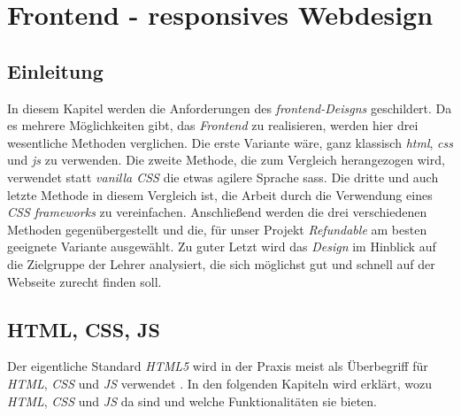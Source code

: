 
\section{Frontend - responsives Webdesign}
\label{chapter:study-frontend}
	\subsection{Einleitung}
	\label{chapter:study-frontend-einleitung}
	In diesem Kapitel werden die Anforderungen des \textit{\Gls{frontend}-Deisgns} geschildert. Da es mehrere Möglichkeiten gibt, das \textit{Frontend} zu realisieren, werden hier drei wesentliche Methoden verglichen. Die erste Variante wäre, ganz klassisch \textit{\Gls{html}}, \textit{\Gls{css}} und \textit{\Gls{js}} zu verwenden. Die zweite Methode, die zum Vergleich herangezogen wird, verwendet statt \textit{\Gls{vanilla} CSS} die etwas agilere Sprache \Gls{sass}. Die dritte und auch letzte Methode in diesem Vergleich ist, die Arbeit durch die Verwendung eines \textit{CSS \Gls{framework}s} zu vereinfachen. Anschließend werden die drei verschiedenen Methoden gegenübergestellt und die, für unser Projekt \textit{Refundable} am besten geeignete Variante ausgewählt. Zu guter Letzt wird das \textit{Design} im Hinblick auf die Zielgruppe der Lehrer analysiert, die sich möglichst gut und schnell auf der Webseite zurecht finden soll.
	
	\subsection{HTML, CSS, JS}
	\label{chapter:study-frontend-html-css-js}
	Der eigentliche Standard \textit{HTML5} wird in der Praxis meist als Überbegriff für \textit{HTML}, \textit{CSS} und \textit{JS} verwendet \cite{html5-css3-handbuch}. In den folgenden Kapiteln wird erklärt, wozu \textit{HTML}, \textit{CSS} und \textit{JS} da sind und welche Funktionalitäten sie bieten.
	
